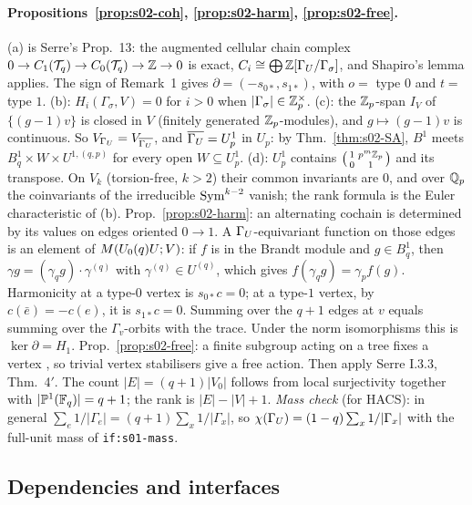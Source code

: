 \paragraph{Propositions~\ref{prop:s02-coh}, \ref{prop:s02-harm}, \ref{prop:s02-free}.}
(a) is Serre's Prop.~13: the augmented cellular chain complex $0\to C_1(\mathcal{T}_q)\to C_0(\mathcal{T}_q)\to\mathbb{Z}\to0$ is exact,
$C_i\cong\bigoplus\mathbb{Z}[\Gamma_U/\Gamma_\sigma]$, and Shapiro's lemma applies. The sign of Remark~1 gives
$\partial=(-s_{0*},s_{1*})$, with $o=$ type $0$ and $t=$ type $1$. (b): $H_{i}(\Gamma_\sigma,V)=0$ for $i>0$ when
$|\Gamma_\sigma|\in\mathbb{Z}_p^\times$. (c): the $\mathbb{Z}_p$-span $I_V$ of $\{(g-1)v\}$ is closed in $V$ (finitely generated
$\mathbb{Z}_p$-modules), and $g\mapsto(g-1)v$ is continuous. So $V_{\Gamma_U}=V_{\overline{\Gamma_U}}$, and
$\overline{\Gamma_U}=U_p^1$ in $U_p$: by Thm.~\ref{thm:s02-SA}, $B^1$ meets $B^1_q\times W\times U^{1,(q,p)}$ for every
open $W\subseteq U_p^1$. (d): $U_p^1$ contains $\left(\begin{smallmatrix}1&p^m\mathbb{Z}_p\\0&1\end{smallmatrix}\right)$ and its
transpose. On $V_k$ (torsion-free, $k>2$) their common invariants are $0$, and over $\mathbb{Q}_p$ the coinvariants of the
irreducible $\mathrm{Sym}^{k-2}$ vanish; the rank formula is the Euler characteristic of (b).
Prop.~\ref{prop:s02-harm}: an alternating cochain is determined by its values on edges oriented $0\to1$. A
$\Gamma_U$-equivariant function on those edges is an element of $M(U_0(q)U;V)$: if $f$ is in the Brandt
module and $g\in B^1_q$, then $\gamma g=(\gamma_qg)\cdot\gamma^{(q)}$ with $\gamma^{(q)}\in U^{(q)}$, which gives
$f(\gamma_qg)=\gamma_pf(g)$. Harmonicity at a type-$0$ vertex is $s_{0*}c=0$; at a type-$1$ vertex, by
$c(\bar e)=-c(e)$, it is $s_{1*}c=0$. Summing over the $q+1$ edges at $v$ equals summing over the
$\Gamma_v$-orbits with the trace. Under the norm isomorphisms this is $\ker\partial=H_1$.
Prop.~\ref{prop:s02-free}: a finite subgroup acting on a tree fixes a vertex
, so trivial vertex stabilisers give a free action. Then apply
Serre I.3.3, Thm.~4$'$. The count $|E|=(q+1)|V_0|$ follows from local surjectivity together with
$|\mathbb P^1(\mathbb{F}_q)|=q+1$; the rank is $|E|-|V|+1$.
\emph{Mass check} (for HACS): in general $\sum_{e}1/|\Gamma_e|=(q+1)\sum_{x}1/|\Gamma_x|$, so
$\chi(\Gamma_U)=(1-q)\sum_x1/|\Gamma_x|$ with the full-unit mass of \texttt{if:s01-mass}.

\subsection{Dependencies and interfaces}
